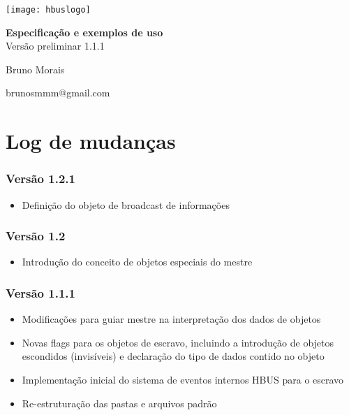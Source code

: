 \documentclass[11pt]{report}
\begin{document}
\newcommand{\hbus}[1]{\texttt{[image: hbus]}}
\newcommand{\hbuscommand}[1]{\textbf{#1}}

\begin{center}
\vspace*{\fill}
\texttt{[image: hbuslogo]}

\huge \textbf{Especificação e exemplos de uso}\\
Versão preliminar 1.1.1
\vspace*{\fill}

Bruno Morais

brunosmmm@gmail.com

\end{center}

\pagebreak

\tableofcontents

\section{Log de mudanças}

\subsubsection{Versão 1.2.1}

\begin{itemize}

\item Definição do objeto de broadcast de informações

\end{itemize}

\subsubsection{Versão 1.2}

\begin{itemize}

\item Introdução do conceito de objetos especiais do mestre

\end{itemize}

\subsubsection{Versão 1.1.1}

\begin{itemize}

\item Modificações para guiar mestre na interpretação dos dados de objetos
\item Novas flags para os objetos de escravo, incluindo a introdução de objetos escondidos (invisíveis) e declaração do tipo de dados contido no objeto
\item Implementação inicial do sistema de eventos internos HBUS para o escravo
\item Re-estruturação das pastas e arquivos padrão

\end{itemize}
\end{document}
